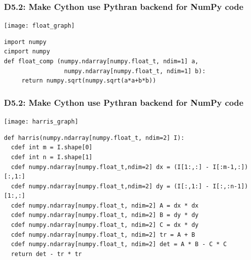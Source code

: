 \documentclass{beamer}
\begin{document}
\begin{frame}[fragile]
  \frametitle{D5.2: Make Cython use Pythran backend for NumPy code}

  \begin{center}
    \texttt{[image: float\_graph]}\\
  \end{center}
  \begin{lstlisting}
import numpy
cimport numpy
def float_comp (numpy.ndarray[numpy.float_t, ndim=1] a,
                 numpy.ndarray[numpy.float_t, ndim=1] b):
     return numpy.sqrt(numpy.sqrt(a*a+b*b))
\end{lstlisting}

\end{frame}
\begin{frame}[fragile]
  \frametitle{D5.2: Make Cython use Pythran backend for NumPy code}

  \begin{center}
    \texttt{[image: harris\_graph]}
  \end{center}

  \begin{lstlisting}[basicstyle=\tiny]
def harris(numpy.ndarray[numpy.float_t, ndim=2] I):
  cdef int m = I.shape[0]
  cdef int n = I.shape[1]
  cdef numpy.ndarray[numpy.float_t,ndim=2] dx = (I[1:,:] - I[:m-1,:])[:,1:]
  cdef numpy.ndarray[numpy.float_t,ndim=2] dy = (I[:,1:] - I[:,:n-1])[1:,:]
  cdef numpy.ndarray[numpy.float_t, ndim=2] A = dx * dx
  cdef numpy.ndarray[numpy.float_t, ndim=2] B = dy * dy
  cdef numpy.ndarray[numpy.float_t, ndim=2] C = dx * dy
  cdef numpy.ndarray[numpy.float_t, ndim=2] tr = A + B
  cdef numpy.ndarray[numpy.float_t, ndim=2] det = A * B - C * C
  return det - tr * tr
\end{lstlisting}

\end{frame}


\end{document}

